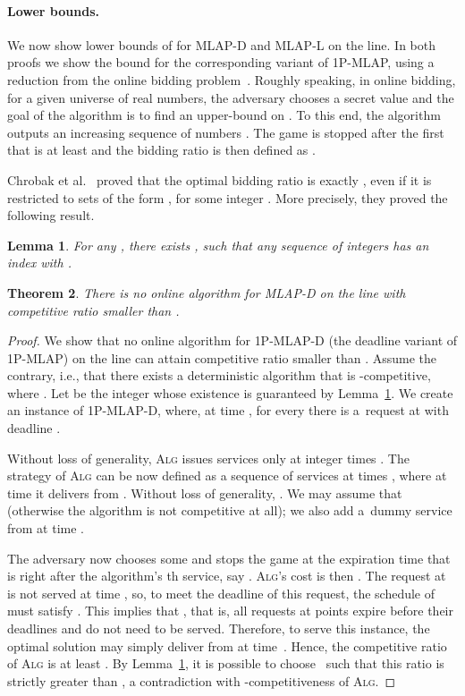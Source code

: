 \documentclass[a4paper]{article}
\newtheorem{theorem}{Theorem}[section]
\newtheorem{lemma}[theorem]{Lemma}
\newcommand{\MLAPL}{\mbox\rm{\textsf{MLAP-L}}}
\newcommand{\MLAPD}{\mbox{\rm\textsf{MLAP-D}}}
\newcommand{\SPMLAP}{\mbox{\rm\textsf{1P-MLAP}}}
\newcommand{\SPMLAPD}{\mbox{\rm\textsf{1P-MLAP-D}}}
\newcommand{\ALG}{\textsc{Alg}}
\begin{document}
\paragraph{Lower bounds.}

We now show lower bounds of  for {\MLAPD} and {\MLAPL} on the line.
In both proofs we show the bound for the corresponding
variant of {\SPMLAP}, using a reduction from the online bidding
problem~\cite{doubling-sigact,online-bidding}. Roughly speaking, in online
bidding, for a given universe  of real numbers, the adversary chooses a secret
value  and the goal of the algorithm is to find an upper-bound
on . To this end, the algorithm outputs an increasing sequence of numbers
. The game is stopped after the first  that is at
least  and the bidding ratio is then defined as .

Chrobak et al.~\cite{online-bidding} proved that the optimal bidding ratio is exactly , even if it is 
restricted to sets   of the form , for some integer . 
More precisely, they proved the following result.

\begin{lemma}
\label{lem:online_bidding}
For any , there exists , such that any sequence of integers 
 has an index  with
.
\end{lemma}


\begin{theorem}
\label{thm:mlapd_path_lower_bound}
There is no online algorithm for {\MLAPD} on the line with competitive ratio smaller than .
\end{theorem}


\begin{proof}
We show that no online algorithm for {\SPMLAPD} (the deadline variant of {\SPMLAP}) 
on the line can attain competitive ratio smaller than . 
Assume the contrary, i.e., that there exists a deterministic algorithm  that is -competitive,
where . 
Let  be the integer whose existence is guaranteed by Lemma~\ref{lem:online_bidding}.
We create an instance of {\SPMLAPD}, where, at time ,
for every   there is a~request at  with deadline .

Without loss of generality, {\ALG} issues services only at integer times .
The strategy of {\ALG} can be now defined as a sequence of services at times 
, where at time  it delivers from 
.  Without loss of
generality, . We may assume that  (otherwise
the algorithm is not competitive at all); we also add a~dummy service from  at time .

The adversary now chooses some  and stops the game at the expiration time that is right after
the algorithm's th service, say .
{\ALG}'s cost is then . 
The request at  is not served at time , so, to meet the deadline of this request,
the schedule of  must satisfy .  
This implies that , that is,
all requests at points  expire 
before their deadlines and do not need to be served.
Therefore, to serve this instance, 
the optimal solution may simply deliver from  at time~. 
Hence, the competitive ratio of {\ALG} is at least 
. By Lemma~\ref{lem:online_bidding}, it is possible to choose~
such that this ratio is strictly greater than , a contradiction with 
-competitiveness of {\ALG}.
\end{proof}
\end{document}
